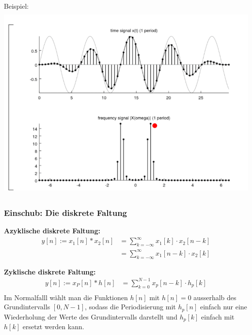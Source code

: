 \documentclass[12pt,a4paper]{scrartcl}
\begin{document}
 \noindent Beispiel: \\
 \includegraphics[height=10cm]{Pictures/WeightedWindow.png}

 \subsubsection{Einschub: Die diskrete Faltung}
  \label{sec:sub:sub:diskrete-faltung}

  \noindent \textbf{Azyklische diskrete Faltung:}
  \begin{equation}
    \label{eq:22}
      \begin{split}
      y[n] := x_1[n] * x_2[n] &= \sum_{k=-\infty}^{\infty} x_1[k] \cdot x_2[n-k] \\
      &= \sum_{k=-\infty}^{\infty} x_1 [n-k] \cdot x_2[k]
      \end{split}
    \end{equation}

    \noindent \textbf{Zyklische diskrete Faltung:}
  \begin{equation}
    \label{eq:23}
      \begin{split}
      y[n] := x_P[n] * h[n] &= \sum_{k=0}^{N-1} x_p[n-k] \cdot h_p[k] \\
      \end{split}
    \end{equation}
    Im Normalfalll wählt man die Funktionen $h[n]$ mit $h[n] = 0$ ausserhalb des Grundintervalls $[0, N-1]$, sodass die Periodisierung mit $h_p[n]$ einfach nur eine Wiederholung der Werte des Grundintervalls darstellt und $h_p[k]$ einfach mit $h[k]$ ersetzt werden kann. \\
\end{document}
